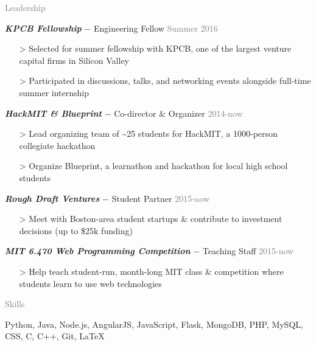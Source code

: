 \documentclass[11pt]{article}
\newcommand{\rsection}[1]{\vspace{1.5em}\textcolor{gray}{\Large \robotoslab #1}\vspace{0.5em}}
\newcommand{\bt}[1]{\textit{\textbf{#1}}} %
\newcommand{\gap}[0]{\vspace{0.5em}} %
\newcommand{\dash}[0]{ $-$ } %
\newcommand{\gray}[1]{\textcolor{gray}{#1}}
\newcommand{\e}[0]{> }
\begin{document}
\rsection{Leadership}

\bt{KPCB Fellowship}\dash Engineering Fellow \hfill \gray{Summer 2016}

\begin{itemize}
\item[\e] Selected for summer fellowship with KPCB, one of the largest venture capital firms in Silicon Valley
\item[\e] Participated in discussions, talks, and networking events alongside full-time summer internship
\end{itemize}

\gap

\bt{HackMIT \& Blueprint}\dash Co-director \& Organizer \hfill \gray{2014-now}

\begin{itemize}
\item[\e] Lead organizing team of \textasciitilde 25 students for HackMIT, a 1000-person collegiate hackathon
\item[\e] Organize Blueprint, a learnathon and hackathon for local high school students
\end{itemize}

\gap

\bt{Rough Draft Ventures}\dash Student Partner \hfill \gray{2015-now}

\begin{itemize}
\item[\e] Meet with Boston-area student startups \& contribute to investment decisions (up to \$25k funding)
\end{itemize}

\gap

\bt{MIT 6.470 Web Programming Competition}\dash Teaching Staff \hfill \gray{2015-now}

\begin{itemize}
\item[\e] Help teach student-run, month-long MIT class \& competition where students learn to use web technologies
\end{itemize}

\rsection{Skills}

Python, Java, Node.js, AngularJS, JavaScript, Flask, MongoDB, PHP, MySQL, CSS, C, C++, Git, {\selectfont\LaTeX}
\end{document}
